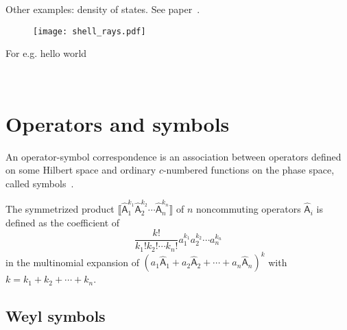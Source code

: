 Other examples: density of states.  See paper~\cite{gillespie1983}.


\begin{figure}
  \begin{center}
    \texttt{[image: shell\_rays.pdf]}
  \end{center}
\end{figure}

For e.g. hello world

\
\section{Operators and symbols}

An operator-symbol correspondence is an association between operators defined on some Hilbert space and ordinary $c$-numbered functions on the phase space, called symbols~\cite[\S 2.3.1]{chaichian2001}.

The symmetrized product $\big\llbracket \hat{\mathsf{A}}_{1}^{k_{1}} \hat{\mathsf{A}}_{2}^{k_{2}} \cdots \hat{\mathsf{A}}_{n}^{k_n} \big\rrbracket$ of $n$ noncommuting operators $\hat{\mathsf{A}}_{i}$ is defined as the coefficient of
%
\begin{equation}
  \frac{k!}{k_{1}!k_{2}!\cdots k_{n}!} a_{1}^{k_{1}} a_{2}^{k_{2}} \cdots a_{n}^{k_{n}}
\end{equation}
%
in the multinomial expansion of $\left(a_{1}\hat{\mathsf{A}}_{1} + a_{2}\hat{\mathsf{A}}_{2} + \cdots + a_{n}\hat{\mathsf{A}}_{n}\right)^{k}$ with $k = k_{1} + k_{2} + \cdots + k_{n}$.

\subsection{Weyl symbols}

